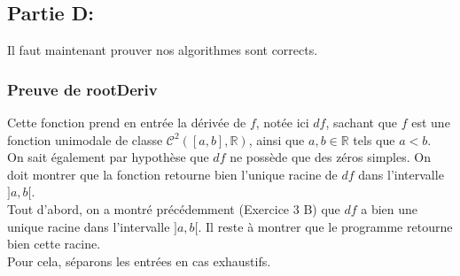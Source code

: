 \documentclass[a4paper, 12pt]{article}
\begin{document}
\newpage

\subsection{Partie D:}

Il faut maintenant prouver nos algorithmes sont corrects.

\subsubsection{Preuve de rootDeriv}

Cette fonction prend en entrée la dérivée de \( f \), notée ici \( df \), sachant que \( f \) est une fonction unimodale de classe \( \mathcal{C}^2([a, b], \mathbb{R}) \), ainsi que \( a, b \in \mathbb{R} \) tels que \( a < b \). \\
On sait également par hypothèse que \( df \) ne possède que des zéros simples.
On doit montrer que la fonction retourne bien l'unique racine de \( df \) dans l'intervalle \( ]a, b[ \). \\
Tout d'abord, on a montré précédemment (Exercice 3 B) que \( df \) a bien une unique racine dans l'intervalle \( ]a, b[ \). Il reste à montrer que le programme retourne bien cette racine. \\
Pour cela, séparons les entrées en cas exhaustifs.
\end{document}
